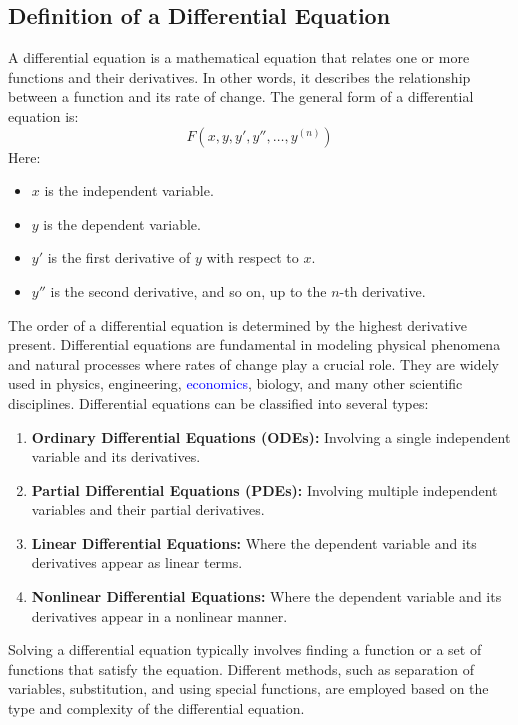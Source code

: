 \documentclass[11pt]{article}
\begin{document}
		\subsection{Definition of a Differential Equation}
			A differential equation is a mathematical equation
			that relates one or more functions and their derivatives.
			In other words, it describes the relationship between a function
			and its rate of change. The general form of a differential equation is:
				\begin{equation}
					F(x,y,y',y'', \dots, y^{(n)})
				\end{equation}
			Here:
			\begin{itemize}
				\item $x$ is the independent variable.
				\item $y$ is the dependent variable.
				\item $y'$ is the first derivative of $y$ with respect to $x$.
				\item $y''$ is the second derivative, and so on, up to the $n$-th derivative.
 			\end{itemize}
			The order of a differential equation is determined by the highest derivative present.
			Differential equations are fundamental in modeling physical phenomena and natural 
			processes where rates of change play a crucial role. They are widely used in physics, 
			engineering, \textcolor{blue}{economics}, biology, and many other scientific disciplines.
			Differential equations can be classified into several types:
				\begin{enumerate}
					\item \textbf{Ordinary Differential Equations (ODEs):} Involving a single independent variable and its derivatives.
					\item \textbf{Partial Differential Equations (PDEs):} Involving multiple independent variables and their partial derivatives.
					\item \textbf{Linear Differential Equations:} Where the dependent variable and its derivatives appear as linear terms.
					\item \textbf{Nonlinear Differential Equations:} Where the dependent variable and its derivatives appear in a nonlinear manner.
				\end{enumerate}
			Solving a differential equation typically involves finding a function or a set of functions 
			that satisfy the equation. Different methods, such as separation of variables, substitution,
			and using special functions, are employed based on the type and
			complexity of the differential equation.
\end{document}
